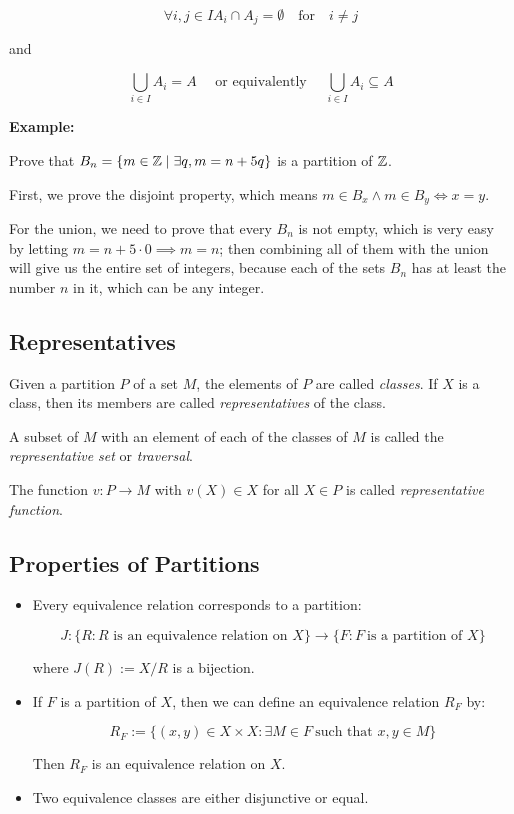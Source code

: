 \[
	\forall i, j \in I A_i \cap A_j = \emptyset \quad \text{for} \quad i \neq j
\]

and

\[
	\bigcup_{i \in I} A_i = A \quad \text{ or equivalently } \quad \bigcup_{i \in I} A_i \subseteq A
\]

\textbf{Example:}

Prove that \(B_n = \{m \in \mathbb{Z} \mid \exists q, m = n + 5q\}\) is a partition of \(\mathbb{Z}\).

First, we prove the disjoint property, which means \(m \in B_x \land m \in B_y \iff x = y\).

For the union, we need to prove that every \(B_n\) is not empty, which is very easy by letting \(m = n + 5\cdot0 \implies m = n\); then
combining all of them with the union will give us the entire set of integers, because each of the sets \(B_n\) has at least the number
\(n\) in it, which can be any integer.

\QED

\subsection{Representatives}

Given a partition \(P\) of a set \(M\), the elements of \(P\) are called \emph{classes}.
If \(X\) is a class, then its members are called \emph{representatives} of the class.

A subset of \(M\) with an element of each of the classes of \(M\) is called the \emph{representative set} or \emph{traversal}.

The function \(v: P \to M\) with \(v(X) \in X\) for all \(X \in P\) is called \emph{representative function}.

\subsection{Properties of Partitions}

\begin{itemize}

	\item Every equivalence relation corresponds to a partition:

	      \[
		      J: \{ R : R \text{ is an equivalence relation on } X\} \to \{ F: F\ \text{is a partition of } X\}
	      \]

	      where \( J(R) := X / R \) is a bijection.

	\item If \(F\) is a partition of \(X\), then we can define an equivalence relation \( R_F \) by:

	      \[
		      R_F := \{ (x, y) \in X \times X : \exists M \in F\ \text{such that } x, y \in M \}
	      \]

	      Then \( R_F \) is an equivalence relation on \(X\).

	\item Two equivalence classes are either disjunctive or equal.

\end{itemize}


